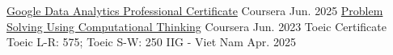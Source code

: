 

\begin{cvhonors}

  \cvhonor
    {\href{https://www.coursera.org/account/accomplishments/specialization/6UJPSUXD2CWI?utm_source=link&utm_medium=certificate&utm_content=cert_image&utm_campaign=sharing_cta&utm_product=prof}{Google Data Analytics Professional Certificate}} %
    {}
    {Coursera}
    {Jun. 2025}
  \cvhonor
    {\href{https://www.coursera.org/account/accomplishments/verify/CQM44XGDXTLX}{Problem Solving Using Computational Thinking}} %
    {}
    {Coursera}
    {Jun. 2023}
  \cvhonor
    {Toeic Certificate} %
    {Toeic L-R: 575; Toeic S-W: 250}
    {IIG - Viet Nam}
    {Apr. 2025}
\end{cvhonors}